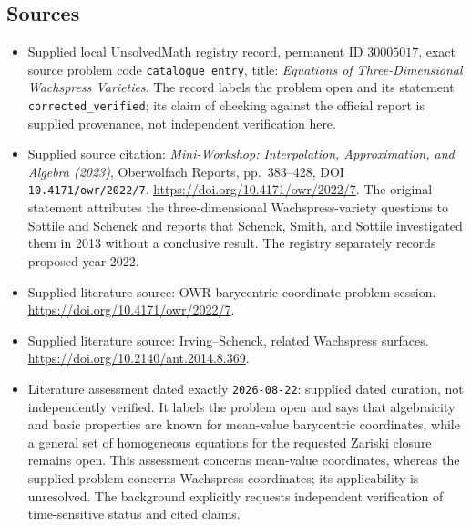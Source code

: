 \documentclass[11pt]{article}
\begin{document}
\subsection{Sources}
\begin{itemize}
\item Supplied local UnsolvedMath registry record, permanent ID \(30005017\), exact source problem code \texttt{catalogue entry}, title: \emph{Equations of Three-Dimensional Wachspress Varieties}. The record labels the problem open and its statement \texttt{corrected\_verified}; its claim of checking against the official report is supplied provenance, not independent verification here.
\item Supplied source citation: \emph{Mini-Workshop: Interpolation, Approximation, and Algebra (2023)}, Oberwolfach Reports, pp.\ 383--428, DOI \texttt{10.4171/owr/2022/7}. \url{https://doi.org/10.4171/owr/2022/7}. The original statement attributes the three-dimensional Wachspress-variety questions to Sottile and Schenck and reports that Schenck, Smith, and Sottile investigated them in 2013 without a conclusive result. The registry separately records proposed year 2022.
\item Supplied literature source: OWR barycentric-coordinate problem session. \url{https://doi.org/10.4171/owr/2022/7}.
\item Supplied literature source: Irving--Schenck, related Wachspress surfaces. \url{https://doi.org/10.2140/ant.2014.8.369}.
\item Literature assessment dated exactly \texttt{2026-08-22}: supplied dated curation, not independently verified. It labels the problem open and says that algebraicity and basic properties are known for mean-value barycentric coordinates, while a general set of homogeneous equations for the requested Zariski closure remains open. This assessment concerns mean-value coordinates, whereas the supplied problem concerns Wachspress coordinates; its applicability is unresolved. The background explicitly requests independent verification of time-sensitive status and cited claims.
\end{itemize}
\end{document}
